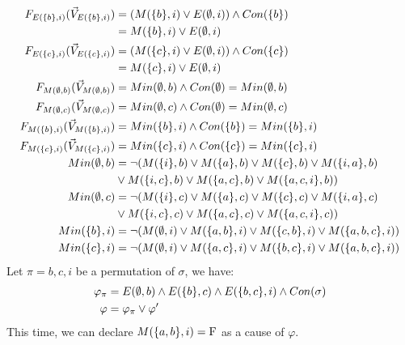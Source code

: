 \begin{example}
\begin{align*}
        F_{E(\{b\},i)}(\vec V_{E(\{b\},i)})   & = (M(\{b\},i) \vee E(\emptyset,i))\wedge Con(\{b\})                         \\
                         & = M(\{b\},i) \vee E(\emptyset,i)                                            \\
        F_{E(\{c\},i)}(\vec V_{E(\{c\},i)})   & = (M(\{c\},i) \vee E(\emptyset,i))\wedge Con(\{c\})                         \\
                         & = M(\{c\},i) \vee E(\emptyset,i)                                            \\
        F_{M(\emptyset,b)}(\vec V_{M(\emptyset,b)})      & = Min(\emptyset,b) \wedge Con(\emptyset) = Min(\emptyset,b)                               \\
        F_{M(\emptyset,c)}(\vec V_{M(\emptyset,c)})      & = Min(\emptyset,c) \wedge Con(\emptyset) = Min(\emptyset,c)                               \\
        F_{M(\{b\},i)}(\vec V_{M(\{b\},i)})   & = Min(\{b\},i) \wedge Con(\{b\}) = Min(\{b\},i)                      \\
        F_{M(\{c\},i)}(\vec V_{M(\{c\},i)})   & = Min(\{c\},i) \wedge Con(\{c\}) = Min(\{c\},i)                      \\
        Min(\emptyset,b)        & = \neg (M(\{i\},b) \vee M(\{a\},b) \vee M(\{c\},b) \vee M(\{i,a\},b) \\
                         & \vee M(\{i,c\},b) \vee M(\{a,c\},b) \vee M(\{a,c,i\},b))             \\
        Min(\emptyset,c)        & = \neg (M(\{i\},c) \vee M(\{a\},c) \vee M(\{c\},c) \vee M(\{i,a\},c) \\
                         & \vee M(\{i,c\},c) \vee M(\{a,c\},c) \vee M(\{a,c,i\},c))             \\
        Min(\{b\},i)     & = \neg (M(\emptyset,i)\vee M(\{a,b\},i) \vee M(\{c,b\},i)
        \vee M(\{a,b,c\},i))                                                                    \\
        Min(\{c\},i)     & = \neg (M(\emptyset,i)\vee M(\{a,c\},i) \vee M(\{b,c\},i)
        \vee M(\{a,b,c\},i))                                                                    \\
    \end{align*}
    Let $\pi = b,c,i$ be a permutation of $\sigma$, we have:
    \begin{align*}
        \varphi_{\pi} & =
        E(\emptyset,b) \wedge E(\{b\},c) \wedge E(\{b,c\},i)
        \wedge Con(\sigma)                            \\
        \varphi       & = \varphi_{\pi} \vee \varphi'
    \end{align*}
    This time, we can declare $M(\{a,b\},i) = \mathrm{F}$ as a cause of $\varphi$.

\end{example}
